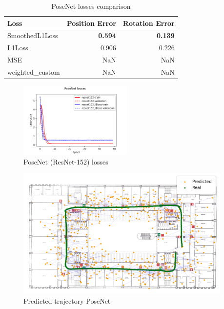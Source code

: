 \begin{table}[htbp]
    \caption{PoseNet losses comparison}
    \begin{center}
        \begin{tabular}{lrr}
            \toprule
            Loss             & {Position Error} & {Rotation Error} \\
            \midrule
            SmoothedL1Loss   & \textbf{0.594}  & \textbf{0.139} \\
            L1Loss           & 0.906           & 0.226          \\
            MSE              & NaN             & NaN            \\
            weighted\_custom & NaN             & NaN            \\
            \bottomrule
        \end{tabular}
        \label{tab:posenet-backends}
    \end{center}
\end{table}

\begin{figure}[h]
    \begin{center}
        \includegraphics[width=0.50\textwidth]{./imgs/posenet_losses.png}
    \end{center}
    \caption{PoseNet (ResNet-152) losses}
    \label{fig:posenet-losses}
\end{figure}

\begin{figure}[h]
    \begin{center}
        \includegraphics[width=0.95\textwidth]{./imgs/posenet_map.png}
    \end{center}
    \caption{Predicted trajectory PoseNet}
    \label{fig:trajectory-posenet}
\end{figure}


